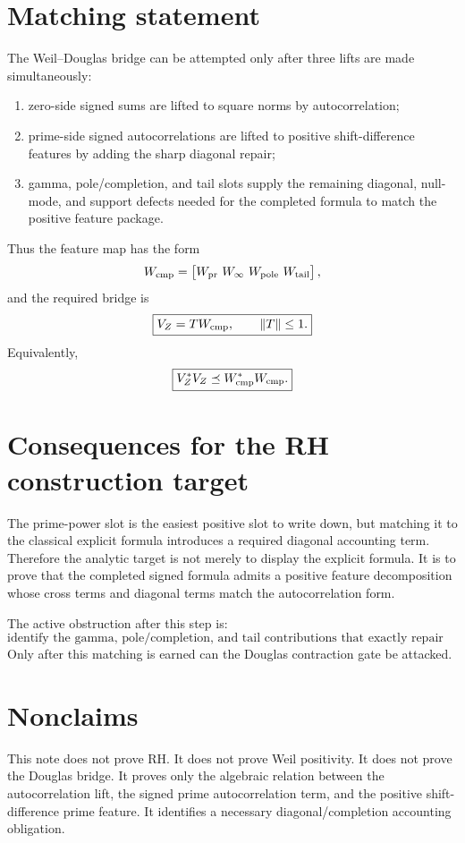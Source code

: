 \documentclass[11pt]{article}
\newcommand{\norm}[1]{\lVert #1\rVert}
\begin{document}
\section{Matching statement}
The Weil--Douglas bridge can be attempted only after three lifts are made simultaneously:
\begin{enumerate}[label=(\roman*)]
  \item zero-side signed sums are lifted to square norms by autocorrelation;
  \item prime-side signed autocorrelations are lifted to positive shift-difference features by adding the sharp diagonal repair;
  \item gamma, pole/completion, and tail slots supply the remaining diagonal, null-mode, and support defects needed for the completed formula to match the positive feature package.
\end{enumerate}
Thus the feature map has the form
\[
  W_{\rm cmp}
  =
  \begin{bmatrix}
  W_{\rm pr}\ W_\infty\ W_{\rm pole}\ W_{\rm tail}
  \end{bmatrix},
\]
and the required bridge is
\[
  \boxed{V_Z=T W_{\rm cmp},\qquad \norm T\le1.}
\]
Equivalently,
\[
  \boxed{V_Z^*V_Z\preceq W_{\rm cmp}^*W_{\rm cmp}.}
\]

\section{Consequences for the RH construction target}
The prime-power slot is the easiest positive slot to write down, but matching it to the classical explicit formula introduces a required diagonal accounting term.  Therefore the analytic target is not merely to display the explicit formula.  It is to prove that the completed signed formula admits a positive feature decomposition whose cross terms and diagonal terms match the autocorrelation form.

The active obstruction after this step is:
\[
  \boxed{
  \text{identify the gamma, pole/completion, and tail contributions that exactly repair the prime-slot diagonal and signed-form defects.}
  }
\]
Only after this matching is earned can the Douglas contraction gate be attacked.

\section{Nonclaims}
This note does not prove RH.  It does not prove Weil positivity.  It does not prove the Douglas bridge.  It proves only the algebraic relation between the autocorrelation lift, the signed prime autocorrelation term, and the positive shift-difference prime feature.  It identifies a necessary diagonal/completion accounting obligation.
\end{document}
